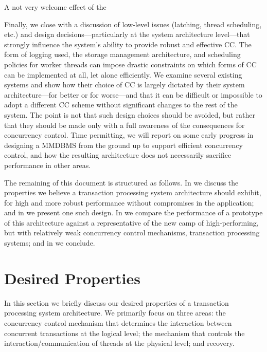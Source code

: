 A not very welcome effect of the 


Finally, we close with a discussion of low-level issues (latching, thread scheduling, etc.) and design decisions---particularly at the system architecture level---that strongly influence the system's ability to provide robust and effective CC. The form of logging used, the storage management architecture, and scheduling policies for worker threads can impose drastic constraints on which forms of CC can be implemented at all, let alone efficiently. We examine several existing systems and show how their choice of CC is largely dictated by their system architecture---for better or for worse---and that it can be difficult or impossible to adopt a different CC scheme without significant changes to the rest of the system. The point is not that such design choices should be avoided, but rather that they should be made only with a full awareness of the consequences for concurrency control. Time permitting, we will report on some early progress in designing a MMDBMS from the ground up to support efficient concurrency control, and how the resulting architecture does not necessarily sacrifice performance in other areas.

The remaining of this document is structured as follows. In  we discuss the properties we believe a transaction processing system architecture should exhibit, for high and more robust performance without compromises in the application; and in  we present one such design. In  we compare the performance of a prototype of this architecture against a representative of the new camp of high-performing, but with relatively weak concurrency control mechanisms, transaction processing systems; and in  we conclude. 

\section{Desired Properties}

In this section we briefly discuss our desired properties of a transaction processing system architecture. We primarily focus on three areas: the concurrency control mechanism that determines the interaction between concurrent transactions at the logical level; the mechanism that controls the interaction/communication of threads at the physical level; and recovery. 

